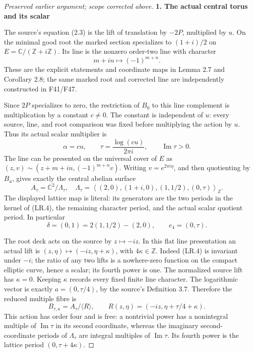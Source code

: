 \begin{proof}[Preserved earlier argument; scope corrected above]
\par

\medskip\noindent\textbf{1. The actual central torus and its scalar}

\par\nobreak

The source's equation (2.3) is the lift of translation by
\(-2P\), multiplied by \(u\). On the minimal good root the marked
section specializes to \((1+i)/2\) on
\(E=\mathbb C/(\mathbb Z+i\mathbb Z)\). Its line is the nonzero
order-two line with character
\[
                  m+in\longmapsto(-1)^{m+n}.          \tag{LR.4}
\]
These are the explicit statements and coordinate maps in Lemma 2.7 and Corollary 2.8; the same marked root
and corrected line are independently constructed in F41/F47.

Since \(2P\) specializes to zero, the restriction of \(B_0\) to
this line complement is multiplication by a constant \(c\ne0\).
The constant is independent of \(u\): every source, line, and root
comparison was fixed before multiplying the action by \(u\).
Thus its actual scalar multiplier is
\[
              \alpha=cu,\qquad
              \tau=\frac{\log(cu)}{2\pi i},
              \qquad\operatorname{Im}\tau>0.         \tag{LR.5}
\]
The line can be presented on the universal cover of \(E\) as
\((z,v)\sim(z+m+in,(-1)^{m+n}v)\). Writing
\(v=e^{2\pi i\eta}\), and then quotienting by \(B_u\), gives
exactly the central abelian surface
\[
 A_\tau=\mathbb C^2/\Lambda_\tau,
 \quad
 \Lambda_\tau=
 \left\langle
  (2,0),(1+i,0),(1,1/2),(0,\tau)
 \right\rangle_{\mathbb Z}.                           \tag{LR.6}
\]
The displayed lattice map is literal: its generators are the two
periods in the kernel of (LR.4), the remaining character period,
and the actual scalar quotient period. In particular
\[
 \delta=(0,1)=2(1,1/2)-(2,0),\qquad e_4=(0,\tau).
\]

The root deck acts on the source by \(z\mapsto-iz\). In this flat
line presentation an actual lift is
\((z,\eta)\mapsto(-iz,\eta+\kappa)\), with
\(4\kappa\in\mathbb Z\). Indeed (LR.4) is invariant under
\(-i\); the ratio of any two lifts is a nowhere-zero function on
the compact elliptic curve, hence a scalar; its fourth power is one.
The normalized source lift has \(\kappa=0\). Keeping \(\kappa\)
records every fixed finite line character. The logarithmic vector
is exactly \(a=(0,\tau/4)\), by the source's Definition 3.7. Therefore the reduced multiple fibre is
\[
 B_{\tau,\kappa}=A_\tau/\langle R\rangle,
 \qquad R(z,\eta)=(-iz,\eta+\tau/4+\kappa).           \tag{LR.7}
\]
This action has order four and is free: a nontrivial power has a
nonintegral multiple of \(\operatorname{Im}\tau\) in its second
coordinate, whereas the imaginary second-coordinate periods of
\(\Lambda_\tau\) are integral multiples of
\(\operatorname{Im}\tau\). Its fourth power is the lattice period
\((0,\tau+4\kappa)\).


\end{proof}
